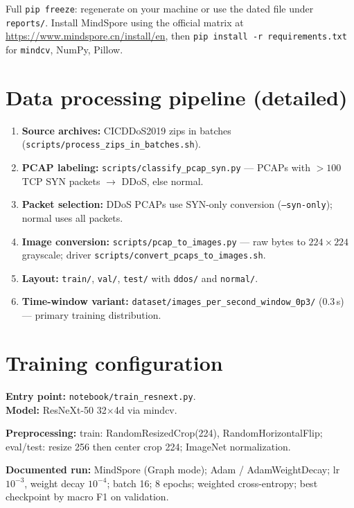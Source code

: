 \noindent
Full \texttt{pip freeze}: regenerate on your machine or use the dated file under \texttt{reports/}.
Install MindSpore using the official matrix at \url{https://www.mindspore.cn/install/en}, then \texttt{pip install -r requirements.txt} for \texttt{mindcv}, NumPy, Pillow.

\section{Data processing pipeline (detailed)}
\label{app:pipeline}

\begin{enumerate}[leftmargin=*]
  \item \textbf{Source archives:} CICDDoS2019 zips in batches (\texttt{scripts/process\_zips\_in\_batches.sh}).
  \item \textbf{PCAP labeling:} \texttt{scripts/classify\_pcap\_syn.py} --- PCAPs with $>100$ TCP SYN packets $\rightarrow$ DDoS, else normal.
  \item \textbf{Packet selection:} DDoS PCAPs use SYN-only conversion (\texttt{--syn-only}); normal uses all packets.
  \item \textbf{Image conversion:} \texttt{scripts/pcap\_to\_images.py} --- raw bytes to $224{\times}224$ grayscale; driver \texttt{scripts/convert\_pcaps\_to\_images.sh}.
  \item \textbf{Layout:} \texttt{train/}, \texttt{val/}, \texttt{test/} with \texttt{ddos/} and \texttt{normal/}.
  \item \textbf{Time-window variant:} \texttt{dataset/images\_per\_second\_window\_0p3/} (0.3\,s) --- primary training distribution.
\end{enumerate}

\section{Training configuration}
\label{app:train}

\noindent\textbf{Entry point:} \texttt{notebook/train\_resnext.py}.\\
\textbf{Model:} ResNeXt-50 32$\times$4d via mindcv.

\noindent\textbf{Preprocessing:} train: RandomResizedCrop(224), RandomHorizontalFlip; eval/test: resize 256 then center crop 224; ImageNet normalization.

\noindent\textbf{Documented run:} MindSpore (Graph mode); Adam / AdamWeightDecay; lr $10^{-3}$, weight decay $10^{-4}$; batch 16; 8 epochs; weighted cross-entropy; best checkpoint by macro F1 on validation.

